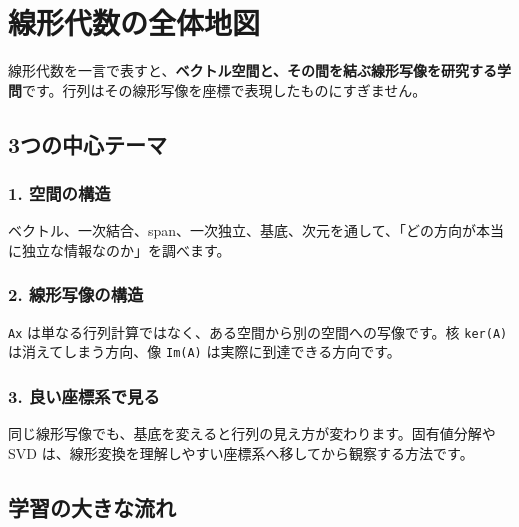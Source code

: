\documentclass[
  11pt,
  a4paper,
]{ltjsarticle}
\author{}
\date{}
\begin{document}
\hypertarget{ux7ddaux5f62ux4ee3ux6570ux306eux5168ux4f53ux5730ux56f3}{%
\section{線形代数の全体地図}\label{ux7ddaux5f62ux4ee3ux6570ux306eux5168ux4f53ux5730ux56f3}}

線形代数を一言で表すと、\textbf{ベクトル空間と、その間を結ぶ線形写像を研究する学問}です。行列はその線形写像を座標で表現したものにすぎません。

\hypertarget{ux3064ux306eux4e2dux5fc3ux30c6ux30fcux30de}{%
\subsection{3つの中心テーマ}\label{ux3064ux306eux4e2dux5fc3ux30c6ux30fcux30de}}

\hypertarget{ux7a7aux9593ux306eux69cbux9020}{%
\subsubsection{1. 空間の構造}\label{ux7a7aux9593ux306eux69cbux9020}}

ベクトル、一次結合、span、一次独立、基底、次元を通して、「どの方向が本当に独立な情報なのか」を調べます。

\hypertarget{ux7ddaux5f62ux5199ux50cfux306eux69cbux9020}{%
\subsubsection{2.
線形写像の構造}\label{ux7ddaux5f62ux5199ux50cfux306eux69cbux9020}}

\texttt{Ax}
は単なる行列計算ではなく、ある空間から別の空間への写像です。核
\texttt{ker(A)} は消えてしまう方向、像 \texttt{Im(A)}
は実際に到達できる方向です。

\hypertarget{ux826fux3044ux5ea7ux6a19ux7cfbux3067ux898bux308b}{%
\subsubsection{3.
良い座標系で見る}\label{ux826fux3044ux5ea7ux6a19ux7cfbux3067ux898bux308b}}

同じ線形写像でも、基底を変えると行列の見え方が変わります。固有値分解や
SVD は、線形変換を理解しやすい座標系へ移してから観察する方法です。

\hypertarget{ux5b66ux7fd2ux306eux5927ux304dux306aux6d41ux308c}{%
\subsection{学習の大きな流れ}\label{ux5b66ux7fd2ux306eux5927ux304dux306aux6d41ux308c}}
\end{document}
